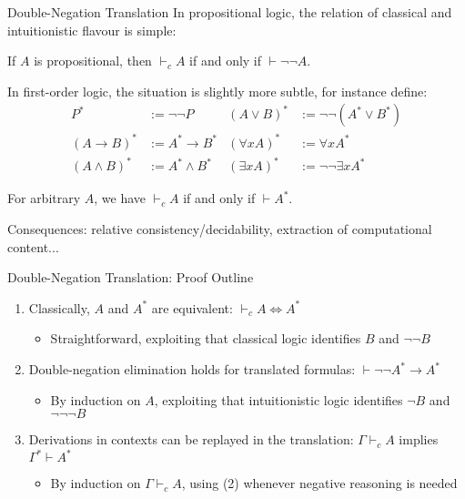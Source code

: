 \documentclass[xcolor=dvipsnames,aspectratio=169,handout]{beamer}
\begin{document}
\begin{frame}{Double-Negation Translation}
	In propositional logic, the relation of classical and intuitionistic flavour is simple:
	\begin{theorem}[Glivenko]
		If $A$ is propositional, then $\vdash_c A$ if and only if $\vdash \neg\neg A$.
	\end{theorem}
	
	\pause
	\vspace{0.3cm}
	In first-order logic, the situation is slightly more subtle, for instance define:
	\begin{align*}
		P^* &:= \neg\neg P & (A\lor B)^* &:=\neg\neg (A^*\lor B^*)\\
		(A\to B)^* &:= A^*\to B^* & (\forall x A)^* &:=\forall  x A^*\\
		(A\land B)^* &:=A^*\land B^* & (\exists x A)^* & := \neg\neg \exists x A^*
	\end{align*}
	
	\pause
	\begin{theorem}
		For arbitrary $A$, we have $\vdash_c A$ if and only if $\vdash A^*$.
	\end{theorem}
	\vspace{0.3cm}
	\pause
	Consequences: relative consistency/decidability, extraction of computational content...
\end{frame}

\begin{frame}{Double-Negation Translation: Proof Outline}
	\begin{enumerate}
		\pause
		\item
		Classically, $A$ and $A^*$ are equivalent: $\vdash_c A\Leftrightarrow A^*$
		\begin{itemize}
			\pause
			\item
			Straightforward, exploiting that classical logic identifies $B$ and $\neg\neg B$
		\end{itemize}
		\vspace{0.7cm}
		\pause
		\item
		Double-negation elimination holds for translated formulas: $\vdash \neg\neg A^*\to A^*$
		\begin{itemize}
			\pause
			\item
			By induction on $A$, exploiting that intuitionistic logic identifies $\neg B$ and $\neg\neg\neg B$
		\end{itemize}
		\vspace{0.7cm}
		\pause
		\item
		Derivations in contexts can be replayed in the translation: $\Gamma\vdash_c A$ implies $\Gamma^*\vdash A^*$
		\begin{itemize}
			\pause
			\item
			By induction on $\Gamma\vdash_c A$, using (2) whenever negative reasoning is needed
		\end{itemize}
	\end{enumerate}
\end{frame}
\end{document}
